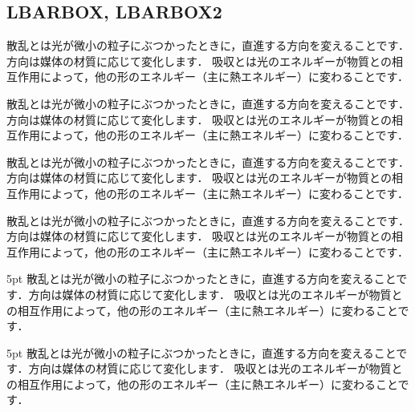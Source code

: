 \documentclass[../main]{subfiles}
\begin{document}
\leaderfill

\subsection{LBARBOX, LBARBOX2}
\begin{LBARBOX}
    散乱とは光が微小の粒子にぶつかったときに，直進する方向を変えることです．方向は媒体の材質に応じて変化します．
    吸収とは光のエネルギーが物質との相互作用によって，他の形のエネルギー（主に熱エネルギー）に変わることです．
\end{LBARBOX}
\begin{code}[language=tex]
\begin{LBARBOX}
    散乱とは光が微小の粒子にぶつかったときに，直進する方向を変えることです．方向は媒体の材質に応じて変化します．
    吸収とは光のエネルギーが物質との相互作用によって，他の形のエネルギー（主に熱エネルギー）に変わることです．
\end{LBARBOX}
\end{code}

\leaderfill

\begin{LBARBOX}[blue]
    散乱とは光が微小の粒子にぶつかったときに，直進する方向を変えることです．方向は媒体の材質に応じて変化します．
    吸収とは光のエネルギーが物質との相互作用によって，他の形のエネルギー（主に熱エネルギー）に変わることです．
\end{LBARBOX}
\begin{code}[language=tex]
\begin{LBARBOX}[blue]
    散乱とは光が微小の粒子にぶつかったときに，直進する方向を変えることです．方向は媒体の材質に応じて変化します．
    吸収とは光のエネルギーが物質との相互作用によって，他の形のエネルギー（主に熱エネルギー）に変わることです．
\end{LBARBOX}
\end{code}

\leaderfill

\begin{LBARBOX2}[red]{5pt}
散乱とは光が微小の粒子にぶつかったときに，直進する方向を変えることです．方向は媒体の材質に応じて変化します．
吸収とは光のエネルギーが物質との相互作用によって，他の形のエネルギー（主に熱エネルギー）に変わることです．
\end{LBARBOX2}
\begin{code}[language=tex]
\begin{LBARBOX2}[red]{5pt}
    散乱とは光が微小の粒子にぶつかったときに，直進する方向を変えることです．方向は媒体の材質に応じて変化します．
    吸収とは光のエネルギーが物質との相互作用によって，他の形のエネルギー（主に熱エネルギー）に変わることです．
\end{LBARBOX2}
\end{code}
\end{document}
